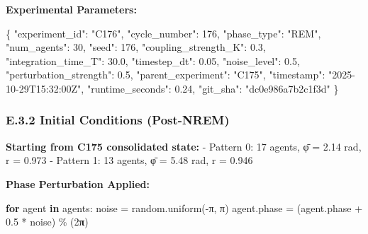 \documentclass[
]{article}
\newenvironment{Shaded}{}{}
\newcommand{\ControlFlowTok}[1]{\textcolor[rgb]{0.00,0.44,0.13}{\textbf{#1}}}
\newcommand{\DataTypeTok}[1]{\textcolor[rgb]{0.56,0.13,0.00}{#1}}
\newcommand{\DecValTok}[1]{\textcolor[rgb]{0.25,0.63,0.44}{#1}}
\newcommand{\ErrorTok}[1]{\textcolor[rgb]{1.00,0.00,0.00}{\textbf{#1}}}
\newcommand{\FloatTok}[1]{\textcolor[rgb]{0.25,0.63,0.44}{#1}}
\newcommand{\FunctionTok}[1]{\textcolor[rgb]{0.02,0.16,0.49}{#1}}
\newcommand{\KeywordTok}[1]{\textcolor[rgb]{0.00,0.44,0.13}{\textbf{#1}}}
\newcommand{\NormalTok}[1]{#1}
\newcommand{\OperatorTok}[1]{\textcolor[rgb]{0.40,0.40,0.40}{#1}}
\newcommand{\StringTok}[1]{\textcolor[rgb]{0.25,0.44,0.63}{#1}}
\begin{document}
\textbf{Experimental Parameters:}

\begin{Shaded}
\begin{Highlighting}[]
\FunctionTok{\{}
  \DataTypeTok{"experiment\_id"}\FunctionTok{:} \StringTok{"C176"}\FunctionTok{,}
  \DataTypeTok{"cycle\_number"}\FunctionTok{:} \DecValTok{176}\FunctionTok{,}
  \DataTypeTok{"phase\_type"}\FunctionTok{:} \StringTok{"REM"}\FunctionTok{,}
  \DataTypeTok{"num\_agents"}\FunctionTok{:} \DecValTok{30}\FunctionTok{,}
  \DataTypeTok{"seed"}\FunctionTok{:} \DecValTok{176}\FunctionTok{,}
  \DataTypeTok{"coupling\_strength\_K"}\FunctionTok{:} \FloatTok{0.3}\FunctionTok{,}
  \DataTypeTok{"integration\_time\_T"}\FunctionTok{:} \FloatTok{30.0}\FunctionTok{,}
  \DataTypeTok{"timestep\_dt"}\FunctionTok{:} \FloatTok{0.05}\FunctionTok{,}
  \DataTypeTok{"noise\_level"}\FunctionTok{:} \FloatTok{0.5}\FunctionTok{,}
  \DataTypeTok{"perturbation\_strength"}\FunctionTok{:} \FloatTok{0.5}\FunctionTok{,}
  \DataTypeTok{"parent\_experiment"}\FunctionTok{:} \StringTok{"C175"}\FunctionTok{,}
  \DataTypeTok{"timestamp"}\FunctionTok{:} \StringTok{"2025{-}10{-}29T15:32:00Z"}\FunctionTok{,}
  \DataTypeTok{"runtime\_seconds"}\FunctionTok{:} \FloatTok{0.24}\FunctionTok{,}
  \DataTypeTok{"git\_sha"}\FunctionTok{:} \StringTok{"dc0e986a7b2c1f3d"}
\FunctionTok{\}}
\end{Highlighting}
\end{Shaded}

\subsubsection{E.3.2 Initial Conditions
(Post-NREM)}\label{e.3.2-initial-conditions-post-nrem}

\textbf{Starting from C175 consolidated state:} - Pattern 0: 17 agents,
φ̄ = 2.14 rad, r = 0.973 - Pattern 1: 13 agents, φ̄ = 5.48 rad, r = 0.946

\textbf{Phase Perturbation Applied:}

\begin{Shaded}
\begin{Highlighting}[]
\ControlFlowTok{for}\NormalTok{ agent }\KeywordTok{in}\NormalTok{ agents:}
\NormalTok{    noise }\OperatorTok{=}\NormalTok{ random.uniform(}\OperatorTok{{-}}\NormalTok{π, π)}
\NormalTok{    agent.phase }\OperatorTok{=}\NormalTok{ (agent.phase }\OperatorTok{+} \FloatTok{0.5} \OperatorTok{*}\NormalTok{ noise) }\OperatorTok{\%}\NormalTok{ (}\DecValTok{2}\ErrorTok{π}\NormalTok{)}
\end{Highlighting}
\end{Shaded}
\end{document}
